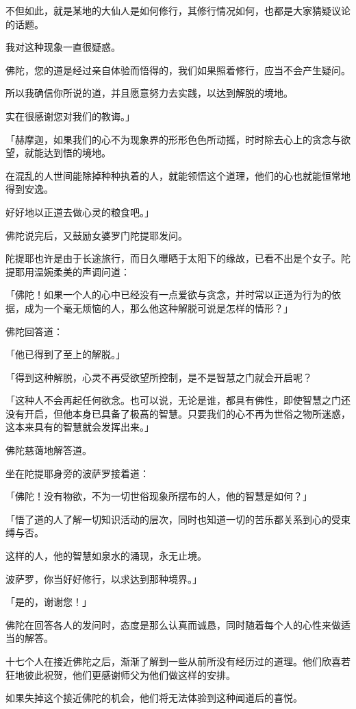 \documentclass[twoside,openany]{book}
\begin{document}
不但如此，就是某地的大仙人是如何修行，其修行情况如何，也都是大家猜疑议论的话题。

我对这种现象一直很疑惑。

佛陀，您的道是经过亲自体验而悟得的，我们如果照着修行，应当不会产生疑问。

所以我确信你所说的道，并且愿意努力去实践，以达到解脱的境地。

实在很感谢您对我们的教诲。」

「赫摩迦，如果我们的心不为现象界的形形色色所动摇，时时除去心上的贪念与欲望，就能达到悟的境地。

在混乱的人世间能除掉种种执着的人，就能领悟这个道理，他们的心也就能恒常地得到安逸。

好好地以正道去做心灵的粮食吧。」

佛陀说完后，又鼓励女婆罗门陀提耶发问。

陀提耶也许是由于长途旅行，而日久曝晒于太阳下的缘故，已看不出是个女子。陀提耶用温婉柔美的声调问道：

「佛陀！如果一个人的心中已经没有一点爱欲与贪念，并时常以正道为行为的依据，成为一个毫无烦恼的人，那么他这种解脱可说是怎样的情形？」

佛陀回答道：

「他已得到了至上的解脱。」

「得到这种解脱，心灵不再受欲望所控制，是不是智慧之门就会开启呢？

「这种人不会再起任何欲念。也可以说，无论是谁，都具有佛性，即使智慧之门还没有开启，但他本身已具备了极髙的智慧。只要我们的心不再为世俗之物所迷惑，这本来具有的智慧就会发挥出来。」

佛陀慈蔼地解答道。

坐在陀提耶身旁的波萨罗接着道：

「佛陀！没有物欲，不为一切世俗现象所摆布的人，他的智慧是如何？」

「悟了道的人了解一切知识活动的层次，同时也知道一切的苦乐都关系到心的受束缚与否。

这样的人，他的智慧如泉水的涌现，永无止境。

波萨罗，你当好好修行，以求达到那种境界。」

「是的，谢谢您！」

佛陀在回答各人的发问时，态度是那么认真而诚恳，同时随着每个人的心性来做适当的解答。

十七个人在接近佛陀之后，渐渐了解到一些从前所没有经历过的道理。他们欣喜若狂地彼此祝贺，他们更感谢师父为他们做这样的安排。

如果失掉这个接近佛陀的机会，他们将无法体验到这种闻道后的喜悦。
\end{document}
